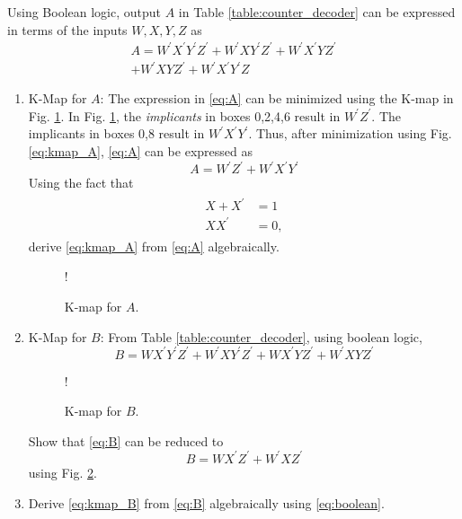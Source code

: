 \documentclass[journal,12pt,twocolumn]{IEEEtran}
\begin{document}
%
Using Boolean logic, output $A$  in Table \ref{table:counter_decoder} can be expressed in terms of the inputs $W,X,Y,Z$ as
\begin{multline}
\label{eq:A}
A = W^{\prime}X^{\prime}Y^{\prime}Z^{\prime} + W^{\prime}XY^{\prime}Z^{\prime}
+W^{\prime}X^{\prime}YZ^{\prime}
\\
+W^{\prime}XYZ^{\prime}
+W^{\prime}X^{\prime}Y^{\prime}Z
\end{multline}
\begin{enumerate}[1.]
\item K-Map for $A$: 
The expression in \eqref{eq:A}  can be minimized using the K-map in Fig. \ref{fig:kmap_A}.
In Fig. \ref{fig:kmap_A},  the {\em implicants} in boxes 0,2,4,6 result in $W^{\prime}Z^{\prime}$.  The implicants in
boxes 0,8 result in $W^{\prime}X^{\prime}Y^{\prime}$.  Thus, after minimization using Fig. \ref{eq:kmap_A},  \eqref{eq:A} can be expressed as
%
\begin{equation}
\label{eq:kmap_A}
A = W^{\prime}Z^{\prime}+W^{\prime}X^{\prime}Y^{\prime}
\end{equation}
%
Using the fact that
\begin{align}
\label{eq:boolean}
\begin{split}
X+X^{\prime} &= 1
\\
XX^{\prime} &= 0,
\end{split}
\end{align}
%
derive \eqref{eq:kmap_A} from \eqref{eq:A} algebraically.
%
%
%
\begin{figure}[!h]
\resizebox {\columnwidth} {!} {

}
\caption{K-map for $A$.}
\label{fig:kmap_A}
\end{figure}
%
\item K-Map for $B$:
From Table \ref{table:counter_decoder}, using boolean logic,
\begin{equation}
\label{eq:B}
B = WX^{\prime}Y^{\prime}Z^{\prime} + W^{\prime}XY^{\prime}Z^{\prime}
+WX^{\prime}YZ^{\prime}
+W^{\prime}XYZ^{\prime}
\end{equation}
%
\begin{figure}[!h]
\resizebox {\columnwidth} {!} {

}
\caption{K-map for $B$.}
\label{fig:kmap_B}
\end{figure}
%
Show that \eqref{eq:B} can be reduced to
\begin{equation}
\label{eq:kmap_B}
B = WX^{\prime}Z^{\prime} + W^{\prime}XZ^{\prime}
\end{equation}
using Fig. \ref{fig:kmap_B}.
\item Derive \eqref{eq:kmap_B} from \eqref{eq:B} algebraically using \eqref{eq:boolean}.

\end{enumerate}
\end{document}
